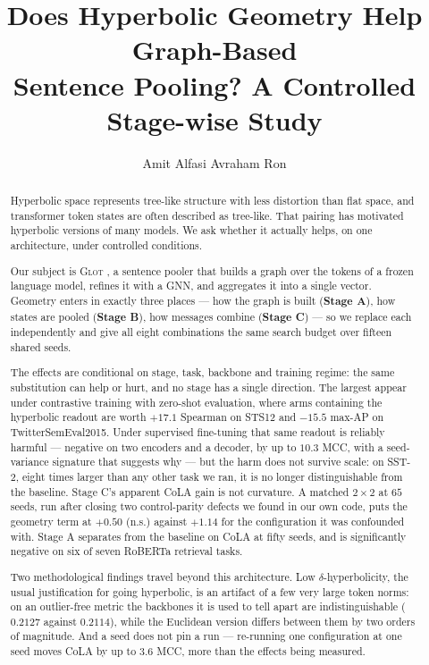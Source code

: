 \documentclass{article}
\title{Does Hyperbolic Geometry Help Graph-Based\\
Sentence Pooling? A Controlled Stage-wise Study}
\author{Amit Alfasi \And Avraham Ron}
\begin{document}
\maketitle
\lhead{}

\begin{abstract}
Hyperbolic space represents tree-like structure with less distortion than flat
space, and transformer token states are often described as tree-like. That
pairing has motivated hyperbolic versions of many models. We ask whether it
actually helps, on one architecture, under controlled conditions.

Our subject is \textsc{Glot} \citep{mantri2026glot}, a sentence pooler that
builds a graph over the tokens of a frozen language model, refines it with a
GNN, and aggregates it into a single vector. Geometry enters in exactly three
places --- how the graph is built (\textbf{Stage A}), how states are pooled
(\textbf{Stage B}), how messages combine (\textbf{Stage C}) --- so we replace
each independently and give all eight combinations the same search budget over
fifteen shared seeds.

The effects are conditional on stage, task, backbone and training regime: the
same substitution can help or hurt, and no stage has a single direction. The
largest appear under contrastive training with zero-shot evaluation, where arms
containing the hyperbolic readout are worth $+17.1$ Spearman on STS12 and
$-15.5$ max-AP on TwitterSemEval2015. Under supervised fine-tuning that same readout is reliably
harmful --- negative on two encoders and a decoder, by up to $10.3$ MCC, with a
seed-variance signature that suggests why --- but the harm does not survive
scale: on SST-2, eight times larger than any other task we ran, it is no longer
distinguishable from the baseline. Stage C's apparent CoLA gain is not
curvature. A matched $2\times2$ at $65$ seeds, run after closing two
control-parity defects we found in our own code, puts the geometry term at
$+0.50$ (n.s.) against $+1.14$ for the configuration it was confounded with.
Stage A separates from the baseline on CoLA at fifty seeds, and is
significantly negative on six of seven RoBERTa retrieval tasks.

Two methodological findings travel beyond this architecture. Low
$\delta$-hyperbolicity, the usual justification for going hyperbolic, is an
artifact of a few very large token norms: on an outlier-free metric the
backbones it is used to tell apart are indistinguishable ($0.2127$ against
$0.2114$), while the Euclidean version differs between them by two orders of
magnitude. And a seed does not pin a run --- re-running one configuration at one
seed moves CoLA by up to $3.6$ MCC, more than the effects being measured.
\end{abstract}
\end{document}
